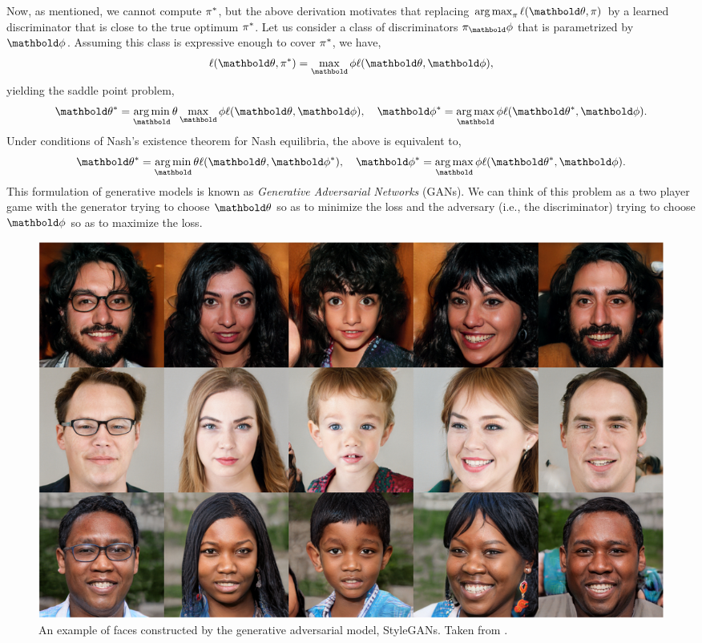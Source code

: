 \documentclass{tufte-handout}
\begin{document}
Now, as mentioned, we cannot compute $\pi^*$, but the above derivation motivates that replacing $\argmax_\pi \ell(\vtheta, \pi)$ by a learned discriminator that is close to the true optimum $\pi^*$. Let us consider a class of discriminators $\pi_\vphi$ that is parametrized by $\vphi$. Assuming this class is expressive enough to cover $\pi^*$, we have, \begin{align}
    \ell(\vtheta, \s{\pi}) = \max_\vphi \ell(\vtheta, \vphi),
\end{align} yielding the saddle point problem, \begin{align}
    \s{\vtheta} = \argmin_\vtheta \max_\vphi \ell(\vtheta, \vphi), \quad \s{\vphi} = \argmax_\vphi \ell(\s{\vtheta}, \vphi).
\end{align} Under conditions of Nash's existence theorem for Nash equilibria, the above is equivalent to, \begin{align}
    \s{\vtheta} = \argmin_\vtheta \ell(\vtheta, \s{\vphi}), \quad \s{\vphi} = \argmax_\vphi \ell(\s{\vtheta}, \vphi).
\end{align} This formulation of generative models is known as \emph{Generative Adversarial Networks} (GANs). We can think of this problem as a two player game with the generator trying to choose $\vtheta$ so as to minimize the loss and the adversary (i.e., the discriminator) trying to choose $\vphi$ so as to maximize the loss.

\begin{figure}
    \includegraphics[width=\textwidth]{figures/faces_gans.png}
    \caption{An example of faces constructed by the generative adversarial model, StyleGANs. Taken from \citep{karras2019style}.}
\end{figure}

\nocite{*}

\end{document}
